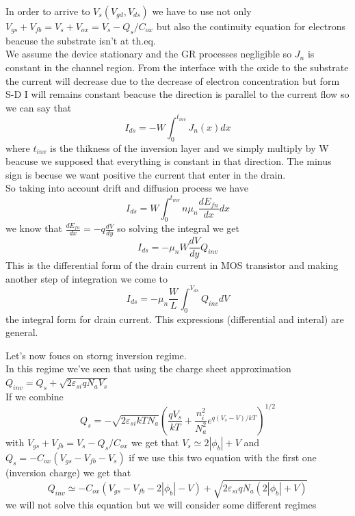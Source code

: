 In order to arrive to $V_s(V_{gd},V_{ds})$ we have to use not only $V_{gs}+V_{fb}=V_{s}+V_{ox}=V_{s}-Q_s/C_{ox}$ but also the continuity equation for electrons beacuse the substrate isn't at th.eq.\\
We assume the device stationary and the GR processes negligible so $J_n$ is constant in the channel region. From the interface with the oxide to the substrate the current will decrease due to the decrease of electron concentration but form S-D I will remains constant beacuse the direction is parallel to the current flow so we can say that
\begin{equation}
I_{ds}=-W\int^{t_{inv}}_0 J_n(x)dx
\end{equation}
where $t_{inv}$ is the thikness of the inversion layer and we simply multiply by W beacuse we supposed that everything is constant in that direction. The minus sign is becuse we want positive the current that enter in the drain.\\
So taking into account drift and diffusion process we have 
\begin{equation}
I_{ds}=W\int^{t_{inv}}_0 n\mu_n \frac{dE_{fn}}{dx} dx
\end{equation}
we know that $\frac{dE_{fn}}{dx}=-q \frac{dV}{dy}$ so solving the integral we get
\begin{equation}
I_{ds}=-\mu_nW \frac{dV}{dy}Q_{inv}
\end{equation}
This is the differential form of the drain current in MOS transistor and making another step of integration we come to 
\begin{equation}
I_{ds}=-\mu_n\frac{W}{L}\int^{V_{ds}}_0Q_{inv}dV
\end{equation}
the integral form for drain current. This expressions (differential and interal) are general.\\
\vspace{5mm}

Let's now foucs on storng inversion regime.\\
In this regime we've seen that using the charge sheet approximation $Q_{inv}=Q_s+\sqrt{2\varepsilon_{si}qN_aV_s}$\\
If we combine  
\begin{equation}
Q_s=-\sqrt{2\varepsilon_{si}kTN_a}\left(\frac{qV_s}{kT}+\frac{n_i^2}{N_a^2}e^{q(V_s-V)/kT}\right)^{1/2}
\end{equation}
with $V_{gs}+V_{fb}=V_{s}-Q_s/C_{ox}$ we get that $V_s\simeq2|\phi_b|+V$ and $Q_s=-C_{ox}(V_{gs}-V_{fb}-V_{s})$ if we use this two equation with the first one (inversion charge) we get that
\begin{equation}
Q_{inv}\simeq -C_{ox}(V_{gs}-V_{fb}-2|\phi_b|-V)+\sqrt{2\varepsilon_{si}qN_a(2|\phi_b|+V)}
\end{equation}
we will not solve this equation but we will consider some different regimes


